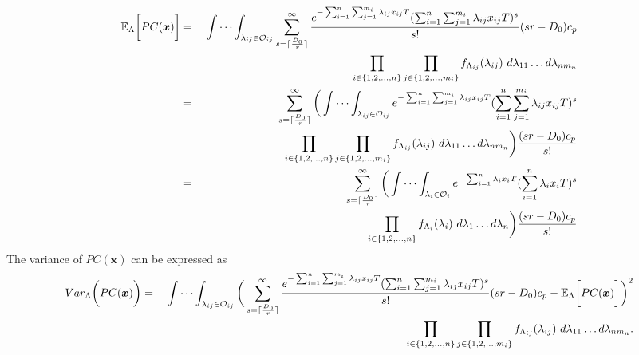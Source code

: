 \documentclass[10pt,a4paper]{article}
\begin{document}
\begin{eqnarray}
\mathbb{E}_{\Lambda} \bigg[ PC(\boldsymbol{x}) \bigg]&= &
\idotsint_{\lambda_{ij} \in \mathcal{O}_{ij}}  \sum_{s=\lceil \frac{D_{0}}{r} \rceil}^{\infty}{\frac{e^{-\sum_{i=1}^{n}\sum_{j=1}^{m_{i}}{\lambda_{ij}x_{ij}} T}(\sum_{i=1}^{n}\sum_{j=1}^{m_{i}}{\lambda_{ij}x_{ij}} T)^s}{s!}(sr-D_{0})c_{p}}  \nonumber \\
&  \  \  \   \       & \prod_{i \in \{1,2,...,n\}} \prod_{j \in \{1,2,...,m_i\}} f_{\Lambda_{ij}}(\lambda_{ij}) \ d\lambda_{11} \dots d\lambda_{n m_n} \nonumber \\
&=& \sum_{s=\lceil \frac{D_{0}}{r} \rceil}^{\infty} \bigg( \idotsint_{\lambda_{ij} \in \mathcal{O}_{ij}} e^{-\sum_{i=1}^{n}\sum_{j=1}^{m_{i}}{\lambda_{ij}x_{ij}} T}(\sum_{i=1}^{n}\sum_{j=1}^{m_{i}}{\lambda_{ij}x_{ij}} T)^s \nonumber \\
&  \ \ \ \             &\prod_{i \in \{1,2,...,n\}} \prod_{j \in \{1,2,...,m_i\}} f_{\Lambda_{ij}}(\lambda_{ij}) \ d\lambda_{11} \dots d\lambda_{n m_n} \bigg) \dfrac{(sr-D_{0})c_{p}}{s!} \nonumber\\
&=& \sum_{s=\lceil \frac{D_{0}}{r} \rceil}^{\infty} \bigg( \idotsint_{\lambda_{i} \in \mathcal{O}_{i}} e^{-\sum_{i=1}^{n}{\lambda_{i}x_{i}} T}(\sum_{i=1}^{n}{\lambda_{i}x_{i}} T)^s \nonumber \\
&  \ \ \ \             &\prod_{i \in \{1,2,...,n\}} f_{\Lambda_{i}}(\lambda_{i}) \ d\lambda_{1} \dots d\lambda_{n} \bigg) \dfrac{(sr-D_{0})c_{p}}{s!}
\end{eqnarray}
The variance of $PC(\boldsymbol{x})$ can be expressed as
\begin{eqnarray}
Var_{\Lambda} \bigg( PC(\boldsymbol{x}) \bigg)&= &
\idotsint_{\lambda_{ij} \in \mathcal{O}_{ij}} \bigg( \sum_{s=\lceil \frac{D_{0}}{r} \rceil}^{\infty}{\frac{e^{-\sum_{i=1}^{n}\sum_{j=1}^{m_{i}}{\lambda_{ij}x_{ij}} T}(\sum_{i=1}^{n}\sum_{j=1}^{m_{i}}{\lambda_{ij}x_{ij}} T)^s}{s!}(sr-D_{0})c_{p}} -\mathbb{E}_{\Lambda} \bigg[ PC(\boldsymbol{x}) \bigg]\bigg)^{2} \nonumber \\
&  \  \  \   \       & \prod_{i \in \{1,2,...,n\}} \prod_{j \in \{1,2,...,m_i\}} f_{\Lambda_{ij}}(\lambda_{ij}) \ d\lambda_{11} \dots d\lambda_{n m_n}.
\end{eqnarray}
\end{document}
